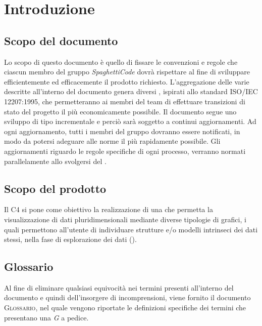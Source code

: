 \section{Introduzione}
\label{sec:introduzione}

\subsection{Scopo del documento}

Lo scopo di questo documento è quello di fissare le convenzioni e regole che ciascun membro del gruppo \emph{SpaghettiCode} dovrà
rispettare al fine di sviluppare efficientemente ed efficacemente il prodotto richiesto. %
L'aggregazione delle varie  descritte all'interno del documento genera diversi , ispirati allo
standard \textsc{ISO/IEC 12207:1995}, che permetteranno ai membri del team di effettuare transizioni di stato del progetto il più
economicamente possibile.
Il documento segue uno sviluppo di tipo incrementale e perciò sarà soggetto a continui aggiornamenti. Ad ogni aggiornamento, tutti i membri del gruppo dovranno essere notificati, in modo da potersi adeguare alle norme il più rapidamente possibile. Gli aggiornamenti riguardo le regole specifiche di ogni processo, verranno normati parallelamente allo svolgersi del .

\subsection{Scopo del prodotto}

Il  \textsc{C4} si pone come obiettivo la realizzazione di una  che
permetta la visualizzazione di dati pluridimensionali mediante diverse tipologie di grafici, i quali permettono
all'utente di individuare strutture e/o modelli intrinseci dei dati stessi, nella fase di esplorazione dei dati
().

\subsection{Glossario}

Al fine di eliminare qualsiasi equivocità nei termini presenti all'interno del documento e quindi dell'insorgere di incomprensioni, viene
fornito il documento \textsc{Glossario}, nel quale vengono riportate le definizioni specifiche dei termini che presentano una
\emph{G} a pedice.

